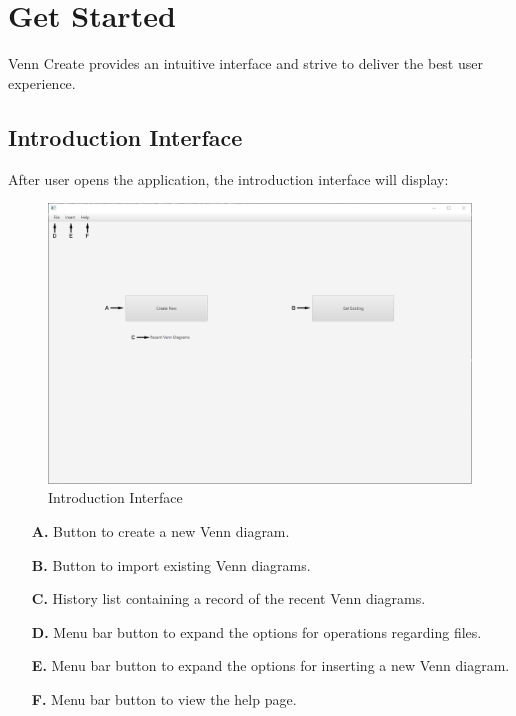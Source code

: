 \documentclass[fontsize=12pt,paper=letter,twoside]{scrartcl}
\begin{document}
\newpage
\section{Get Started}

Venn Create provides an intuitive interface and strive to deliver the best user experience.

\subsection{Introduction Interface}

 After user opens the application, the introduction interface will display:

\begin{figure}[hbt]
	\begin{mdframed}
		\includegraphics[width=\textwidth]{images/intro-screenshot.png}
	\end{mdframed}
	\caption{Introduction Interface}
\end{figure}

\begin{itemize}
	\item[\textbf{A.}] {
		Button to create a new Venn diagram.
	}
	\item[\textbf{B.}] {
		Button to import existing Venn diagrams.
	}
	\item[\textbf{C.}] {
		History list containing a record of the recent Venn diagrams.
	}
	\item[\textbf{D.}] {
		Menu bar button to expand the options for operations regarding files.
	}
	\item[\textbf{E.}] {
		Menu bar button to expand the options for inserting a new Venn diagram.
	}
	\item[\textbf{F.}] {
		Menu bar button to view the help page.
	}
\end{itemize}
\end{document}
